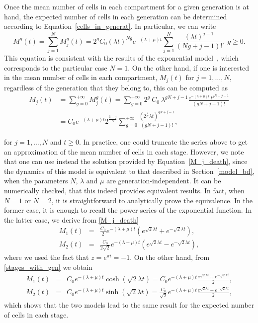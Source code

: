\documentclass[10pt]{article}
\numberwithin{equation}{section}
\begin{document}
Once the mean number of cells in each compartment for a given generation is at hand, the expected number of cells in each generation can be determined according to Equation~\eqref{cells_in_generat}. In particular, we can write
\begin{equation}
\label{cell_gen_g}
    M^g(t) = \sum_{j=1}^{N} M^g_j(t) = 2^g C_0 (\lambda t)^{Ng} e^{-(\lambda+\mu)t} \sum_{j=1}^N \frac{(\lambda t)^{j-1}}{(Ng+j-1)!}, \ g \ge 0.
\end{equation}
This equation is consistent with the results of the exponential model~\cite{luzyanina2007computational}, which corresponds to the particular case $N=1$. On the other hand, if one is interested in the mean number of cells in each compartment, $M_j(t)$ for $j=1,\dots,N$, regardless of the generation that they belong to, this can be computed as
\begin{equation}
\label{stages_with_gen}
\begin{split}
M_j(t) &= \sum_{g=0}^{+\infty} M^g_j(t) = \sum_{g=0}^{+\infty} 2^g \ C_0 \ \lambda^{gN+j-1} \frac{e^{-( \lambda + \mu) t} \ t^{gN+j-1}}{(gN+j-1)!}\\
&= C_0 e^{-( \lambda + \mu) t} 2^{\frac{1-j}{N}} 
\sum_{g=0}^{+\infty} \frac{\left(2^{\frac{1}{N}} \lambda t\right)^{gN+j-1}}{(gN+j-1)!},
\end{split}
\end{equation}
\par\noindent for $j=1,\ldots,N$ and $t\geq0$. In practice, one could truncate the series above to get an approximation of the mean number of cells in each stage. However, we note that one can use instead the solution provided by Equation~\eqref{M_j_death}, since the dynamics of this model is  equivalent to that described in Section~\ref{model_bd}, when the parameters $N$, $\lambda$ and $\mu$ are generation-independent. It can be  numerically checked, that this indeed provides equivalent results. In fact, when $N=1$ or $N=2$, it is straightforward to analytically prove the equivalence. In the former case, it is enough to recall the power series of the exponential function. In the latter case, we derive from \eqref{M_j_death}
\begin{eqnarray*}
    M_1(t) &=& \frac{C_0}{2} e^{-(\lambda+\mu)t} \left( e^{\sqrt{2} \lambda t} + e^{- \sqrt{2} \lambda t} \right),
    \\
    M_2(t) &=&  \frac{C_0}{2 \sqrt{2}} e^{-(\lambda+\mu)t} \left( e^{\sqrt{2} \lambda t} - e^{- \sqrt{2} \lambda t} \right),
\end{eqnarray*}
where we used the fact that $z=e^{\pi i}=-1$. On the other hand, from \eqref{stages_with_gen} we obtain
\begin{eqnarray*}
    M_1(t) &=& C_0 e^{-(\lambda+\mu)t} \cosh \left(\sqrt{2} \lambda t\right)
    = C_0 e^{-(\lambda+\mu)t} \frac{e^{\sqrt{2} \lambda t} + e^{- \sqrt{2} \lambda t}}{2}, \\
    M_2(t) &=& C_0 e^{-(\lambda+\mu)t} \sinh \left(\sqrt{2} \lambda t\right)
    = \frac{C_0}{\sqrt{2}} e^{-(\lambda+\mu)t} \frac{e^{\sqrt{2} \lambda t} - e^{- \sqrt{2} \lambda t}}{2},
\end{eqnarray*}
which shows that the two models lead to the same result for the expected number of cells in each stage.
\end{document}
